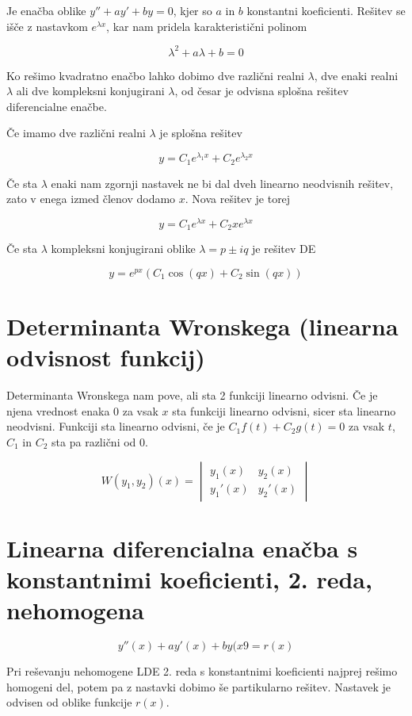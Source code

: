\documentclass[12pt]{report}
\begin{document}
Je enačba oblike $y'' + ay' +by = 0$, kjer so $a$ in $b$ konstantni koeficienti. Rešitev se išče z nastavkom $e^{\lambda x}$, kar nam pridela karakteristični polinom

\[ \lambda ^2 + a\lambda + b = 0\]

Ko rešimo kvadratno enačbo lahko dobimo dve različni realni $\lambda$, dve enaki realni $\lambda$ ali dve kompleksni konjugirani $\lambda$, od česar je odvisna splošna rešitev diferencialne enačbe.

Če imamo dve različni realni $\lambda$ je splošna rešitev

\[y=C_1e^{\lambda_1x}+C_2e^{\lambda_2x}\]

Če sta $\lambda$ enaki nam zgornji nastavek ne bi dal dveh linearno neodvisnih rešitev, zato v enega izmed členov dodamo $x$. Nova rešitev je torej

\[y=C_1e^{\lambda x}+C_2xe^{\lambda x}\]


Če sta $\lambda$ kompleksni konjugirani oblike $\lambda = p\pm iq$ je rešitev DE

\[y=e^{px}(C_1 \cos(qx)+C_2 \sin(qx)) \]


\section*{Determinanta Wronskega (linearna odvisnost funkcij)}


Determinanta Wronskega nam pove, ali sta 2 funkciji linearno odvisni. Če je njena vrednost enaka 0 za vsak $x$ sta funkciji linearno odvisni, sicer sta linearno neodvisni. Funkciji sta linearno odvisni, če je $C_1f(t)+C_2g(t)=0$ za vsak $t$, $C_1$ in $C_2$ sta pa različni od 0.

\[
W(y_1,y_2)(x)=
\begin{vmatrix}
y_1(x) & y_2(x)\\ 
y_1'(x) & y_2'(x)
\end{vmatrix}
\]


\section*{Linearna diferencialna enačba s konstantnimi koeficienti, 2. reda, nehomogena}

\[y''(x) +ay'(x) +by(x9 = r(x)\]

Pri reševanju nehomogene LDE 2. reda s konstantnimi koeficienti najprej rešimo homogeni del, potem pa z nastavki dobimo še partikularno rešitev. Nastavek je odvisen od oblike funkcije $r(x)$.
\end{document}
